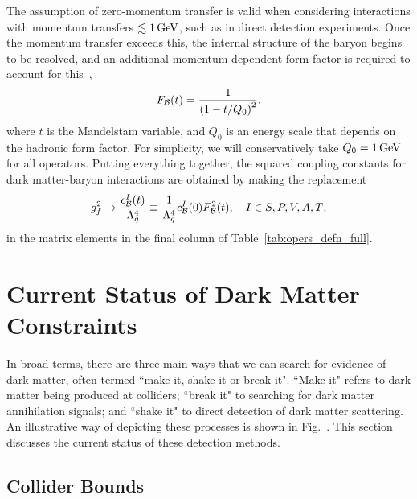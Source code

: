 The assumption of zero-momentum transfer is valid when considering interactions with momentum transfers $\lesssim 1{\rm \,GeV}$, such as in direct detection experiments. Once the momentum transfer exceeds this, the internal structure of the baryon begins to be resolved, and an additional momentum-dependent form factor is required to account for this~\cite{_ElectromagneticStructureNucleon},
\begin{equation}
    F_{\cal B}(t) = \frac{1}{\left( 1 - t/Q_0\right)^2},
\end{equation}
where $t$ is the Mandelstam variable, and $Q_0$ is an energy scale that depends on the hadronic form factor. For simplicity, we will conservatively take $Q_0 = 1 {\rm \,GeV}$ for all operators.
Putting everything together, the squared coupling constants for dark matter-baryon interactions are obtained by making the replacement
\begin{equation}
    g_f^2 \rightarrow \frac{c^I_{\cal B}(t)}{\Lambda_q^4} \equiv \frac{1}{\Lambda_q^4}c_{\cal B}^I(0)F^2_{\cal B}(t),\quad I\in {S, P, V, A, T},
\end{equation}
in the matrix elements in the final column of Table~\ref{tab:opers_defn_full}.



\section{Current Status of Dark Matter Constraints}

In broad terms, there are three main ways that we can search for evidence of dark matter, often termed ``make it, shake it or break it". ``Make it" refers to dark matter being produced at colliders; ``break it" to searching for dark matter annihilation signals; and ``shake it" to direct detection of dark matter scattering. An illustrative way of depicting these processes is shown in Fig.~. This section discusses the current status of these detection methods. 


\subsection{Collider Bounds}

